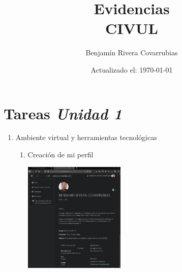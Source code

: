 \documentclass[12pt]{article}
\title{Evidencias \\\bf{CIVUL}}
\author{Benjam\'in Rivera Covarrubias}
\date{Actualizado el: \today}
\begin{document}
\maketitle


\section *{Tareas \it Unidad 1}
	\begin{enumerate}[{\bf Sesi\'on} 1{.}]

		\item {Ambiente virtual y herramientas tecnológicas}
			\begin{enumerate}[{\bf Actividad} 1{.}]
				
				\item {Creación de mi perfil}
					\begin{multicols}{2}			
						\includegraphics[width=0.4\textwidth]{CIVUL-U1-S1-A1-1}
					\end{multicols}
					

\end{enumerate}
\end{enumerate}
\end{document}
